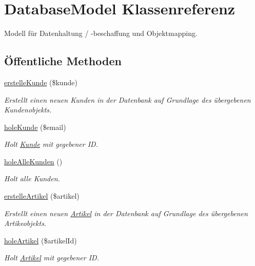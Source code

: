 \hypertarget{classDatabaseModel}{\section{\-Database\-Model \-Klassenreferenz}
\label{classDatabaseModel}
}


\-Modell für \-Datenhaltung / -\/beschaffung und \-Objektmapping.  


\subsection*{Öffentliche \-Methoden}
\begin{DoxyCompactItemize}
\item 
\hyperlink{classDatabaseModel_a94c3702cc35d4de706cd5ef39bfdfae1}{erstelle\-Kunde} (\$kunde)
\begin{DoxyCompactList}\small\item\em \-Erstellt einen neuen \-Kunden in der \-Datenbank auf \-Grundlage des übergebenen \-Kundenobjekts. \end{DoxyCompactList}\item 
\hyperlink{classDatabaseModel_ae9cad447a2bcbd83b96de81321010b0f}{hole\-Kunde} (\$email)
\begin{DoxyCompactList}\small\item\em \-Holt \hyperlink{classKunde}{\-Kunde} mit gegebener \-I\-D. \end{DoxyCompactList}\item 
\hyperlink{classDatabaseModel_ac53cfe4dc2114e8ef29a70ddc11ffefb}{hole\-Alle\-Kunden} ()
\begin{DoxyCompactList}\small\item\em \-Holt alle \-Kunden. \end{DoxyCompactList}\item 
\hyperlink{classDatabaseModel_a1663ad3dbe1ee04ced956ce44ff2923b}{erstelle\-Artikel} (\$artikel)
\begin{DoxyCompactList}\small\item\em \-Erstellt einen neuen \hyperlink{classArtikel}{\-Artikel} in der \-Datenbank auf \-Grundlage des übergebenen \-Artikeobjekts. \end{DoxyCompactList}\item 
\hyperlink{classDatabaseModel_adab376d3339580306adab2d56641f61c}{hole\-Artikel} (\$artikel\-Id)
\begin{DoxyCompactList}\small\item\em \-Holt \hyperlink{classArtikel}{\-Artikel} mit gegebener \-I\-D. \end{DoxyCompactList}\item 

\end{DoxyCompactItemize}
